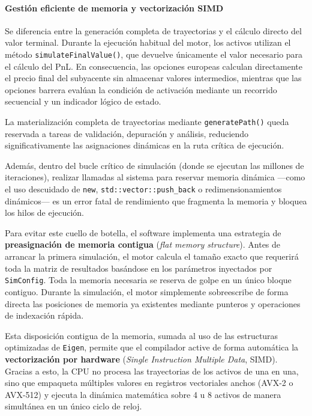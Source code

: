 \documentclass[11pt]{article}
\begin{document}
\paragraph{Gestión eficiente de memoria y vectorización SIMD}

Se diferencia entre la generación completa de trayectorias y el cálculo directo del valor terminal. Durante la ejecución habitual del motor, los activos utilizan el método \texttt{simulateFinalValue()}, que devuelve únicamente el valor necesario para el cálculo del PnL. En consecuencia, las opciones europeas calculan directamente el precio final del subyacente sin almacenar valores intermedios, mientras que las opciones barrera evalúan la condición de activación mediante un recorrido secuencial y un indicador lógico de estado.

La materialización completa de trayectorias mediante \texttt{generatePath()} queda reservada a tareas de validación, depuración y análisis, reduciendo significativamente las asignaciones dinámicas en la ruta crítica de ejecución.

Además, dentro del bucle crítico de simulación (donde se ejecutan las millones de iteraciones), realizar llamadas al sistema para reservar memoria dinámica —como el uso descuidado de \texttt{new}, \texttt{std::vector::push\_back} o redimensionamientos dinámicos— es un error fatal de rendimiento que fragmenta la memoria y bloquea los hilos de ejecución.

Para evitar este cuello de botella, el software implementa una estrategia de \textbf{preasignación de memoria contigua} (\textit{flat memory structure}). Antes de arrancar la primera simulación, el motor calcula el tamaño exacto que requerirá toda la matriz de resultados basándose en los parámetros inyectados por \texttt{SimConfig}. Toda la memoria necesaria se reserva de golpe en un único bloque contiguo. Durante la simulación, el motor simplemente sobreescribe de forma directa las posiciones de memoria ya existentes mediante punteros y operaciones de indexación rápida.

Esta disposición contigua de la memoria, sumada al uso de las estructuras optimizadas de \texttt{Eigen}, permite que el compilador active de forma automática la \textbf{vectorización por hardware} (\textit{Single Instruction Multiple Data}, SIMD). Gracias a esto, la CPU no procesa las trayectorias de los activos de una en una, sino que empaqueta múltiples valores en registros vectoriales anchos (AVX-2 o AVX-512) y ejecuta la dinámica matemática sobre 4 u 8 activos de manera simultánea en un único ciclo de reloj.
\end{document}

